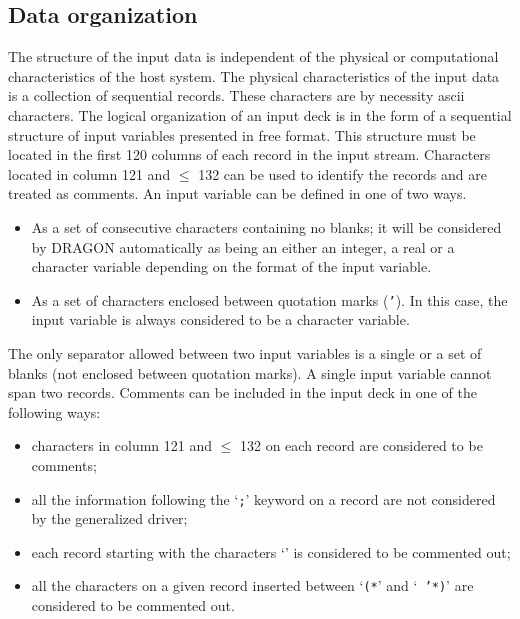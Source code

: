 \subsection{Data organization}\label{sect:DataOrg}

The structure of the input data is independent of the physical or computational
characteristics of the host system. The physical characteristics of the input
data is a collection of sequential records. These characters are by necessity
{\sc ascii} characters. The logical organization of an input deck is in the form
of a sequential structure of input variables presented in free format. This
structure must be located in the first 120 columns of each record in the input
stream. Characters located in column 121 and $\le$ 132 can be used to identify the
records and are treated as comments. An input variable can be defined in one of
two ways.

\begin{itemize}

\item As a set of consecutive characters containing no blanks; it will be
considered by DRAGON automatically as being an either an integer, a real or a
character variable depending on the format of the input variable.

\item As a set of characters enclosed between quotation marks ({\tt '}). In
this case, the input variable is always considered to be a character variable. 

\end{itemize}


The only separator allowed between two input variables is a single or a set of
blanks (not enclosed between quotation marks). A single input variable cannot
span two records. Comments can be included in the input deck in one of the
following ways:


\begin{itemize}

\item  characters in column 121 and $\le$ 132 on each record are considered to be
comments;

\item  all the information following the `{\tt ;}' keyword on a record are not
considered by the generalized driver;

\item  each record starting with the characters `{\tt *}' is considered to be
commented out;

\item  all the characters on a given record inserted between `{\tt (*}' and `{\tt
'*)}' are considered to be commented out.

\end{itemize}


